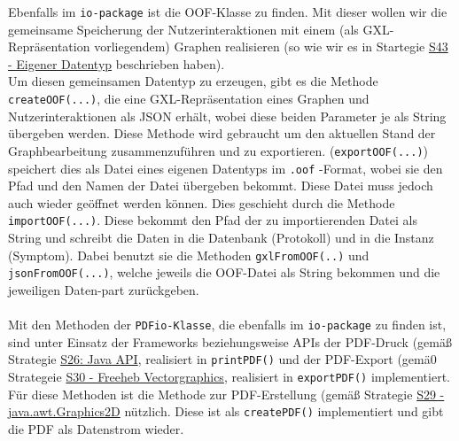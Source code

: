 \documentclass[enabledeprecatedfontcommands,fontsize=11pt,paper=a4,twoside]{scrartcl}
\newcounter{one}
\begin{document}
Ebenfalls im \texttt{io-package} ist die OOF-Klasse zu finden. Mit dieser wollen wir die gemeinsame Speicherung der Nutzerinteraktionen mit einem (als GXL-Repräsentation vorliegendem) Graphen realisieren (so wie wir es in Startegie \hyperlink{ooo}{S43 - Eigener Datentyp} beschrieben haben). \\
Um diesen gemeinsamen Datentyp zu erzeugen, gibt es die Methode \texttt{createOOF(...)}, die eine GXL-Repräsentation eines Graphen und Nutzerinteraktionen als JSON erhält, wobei diese beiden Parameter je als String übergeben werden. Diese Methode wird gebraucht um den aktuellen Stand der Graphbearbeitung zusammenzuführen und zu exportieren. (\texttt{exportOOF(...)}) speichert dies als Datei eines eigenen Datentyps im \texttt{.oof} -Format, wobei sie den Pfad und den Namen der Datei übergeben bekommt. Diese Datei muss jedoch auch wieder geöffnet werden können. Dies geschieht durch die Methode \texttt{importOOF(...)}. Diese bekommt den Pfad der zu importierenden Datei als String und schreibt die Daten in die Datenbank (Protokoll) und in die Instanz (Symptom). Dabei benutzt sie die Methoden \texttt{gxlFromOOF(..)} und \texttt{jsonFromOOF(...)}, welche jeweils die OOF-Datei als String bekommen und die jeweiligen Daten-part zurückgeben. \\ \\

Mit den Methoden der \texttt{PDFio-Klasse}, die ebenfalls im \texttt{io-package} zu finden ist, sind unter Einsatz der Frameworks beziehungsweise APIs der PDF-Druck (gemäß Strategie \hyperlink{ggg}{S26: Java API}, realisiert in \texttt{printPDF()} und der PDF-Export (gemä0 Strategeie \hyperlink{iii}{S30 - Freeheb Vectorgraphics}, realisiert in \texttt{exportPDF()} implementiert. Für diese Methoden ist die Methode zur PDF-Erstellung (gemäß Strategie \hyperlink{hhh}{S29 - java.awt.Graphics2D} nützlich. Diese ist als \texttt{createPDF()} implementiert und gibt die PDF als Datenstrom wieder. \\ \\ \\
\end{document}
